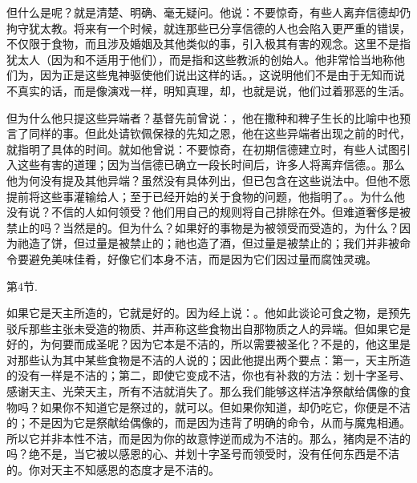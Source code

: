 但什么是呢？就是清楚、明确、毫无疑问。他说：不要惊奇，有些人离弃信德却仍拘守犹太教。将来有一个时候，就连那些已分享信德的人也会陷入更严重的错误，不仅限于食物，而且涉及婚姻及其他类似的事，引入极其有害的观念。这里不是指犹太人（因为和不适用于他们），而是指和这些教派的创始人。他非常恰当地称他们为，因为正是这些鬼神驱使他们说出这样的话。，这说明他们不是由于无知而说不真实的话，而是像演戏一样，明知真理，却，也就是说，他们过着邪恶的生活。\par

但为什么他只提这些异端者？基督先前曾说：，他在撒种和稗子生长的比喻中也预言了同样的事。但此处请钦佩保禄的先知之恩，他在这些异端者出现之前的时代，就指明了具体的时间。就如他曾说：不要惊奇，在初期信德建立时，有些人试图引入这些有害的道理；因为当信德已确立一段长时间后，许多人将离弃信德。。那么他为何没有提及其他异端？虽然没有具体列出，但已包含在这些说法中。但他不愿提前将这些事灌输给人；至于已经开始的关于食物的问题，他指明了。。为什么他没有说？不信的人如何领受？他们用自己的规则将自己排除在外。但难道奢侈是被禁止的吗？当然是的。但为什么？如果好的事物是为被领受而受造的，为什么？因为祂造了饼，但过量是被禁止的；祂也造了酒，但过量是被禁止的；我们并非被命令要避免美味佳肴，好像它们本身不洁，而是因为它们因过量而腐蚀灵魂。\par

第4节. \par

如果它是天主所造的，它就是好的。因为经上说：。他如此谈论可食之物，是预先驳斥那些主张未受造的物质、并声称这些食物出自那物质之人的异端。但如果它是好的，为何要而成圣呢？因为它本是不洁的，所以需要被圣化？不是的，他这里是对那些认为其中某些食物是不洁的人说的；因此他提出两个要点：第一，天主所造的没有一样是不洁的；第二，即使它变成不洁，你也有补救的方法：划十字圣号、感谢天主、光荣天主，所有不洁就消失了。那么我们能够这样洁净祭献给偶像的食物吗？如果你不知道它是祭过的，就可以。但如果你知道，却仍吃它，你便是不洁的；不是因为它是祭献给偶像的，而是因为违背了明确的命令，从而与魔鬼相通。所以它并非本性不洁，而是因为你的故意悖逆而成为不洁的。那么，猪肉是不洁的吗？绝不是，当它被以感恩的心、并划十字圣号而领受时，没有任何东西是不洁的。你对天主不知感恩的态度才是不洁的。\par

